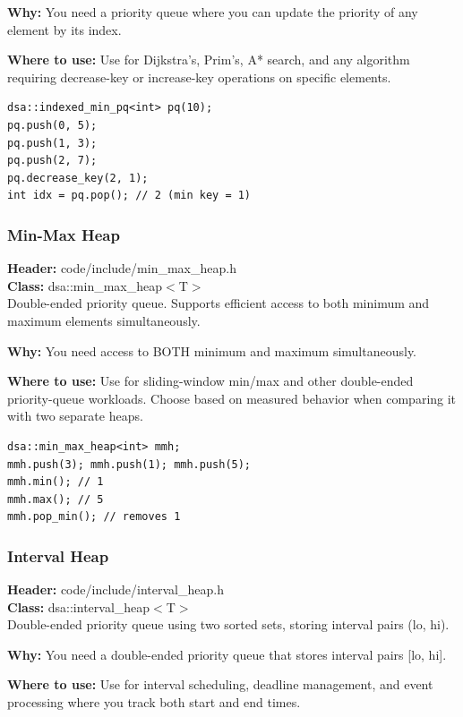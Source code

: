 \documentclass[11pt]{article}
\begin{document}
\textbf{Why:} You need a priority queue where you can update the priority of any element by its index. \par \textbf{Where to use:} Use for Dijkstra's, Prim's, A* search, and any algorithm requiring decrease-key or increase-key operations on specific elements.

\begin{lstlisting}
dsa::indexed_min_pq<int> pq(10);
pq.push(0, 5);
pq.push(1, 3);
pq.push(2, 7);
pq.decrease_key(2, 1);
int idx = pq.pop(); // 2 (min key = 1)
\end{lstlisting}

\subsubsection{Min-Max Heap}
\textbf{Header:} code/include/min\_max\_heap.h\\
\textbf{Class:} dsa::min\_max\_heap$<$T$>$\\

Double-ended priority queue. Supports efficient access to both minimum and maximum elements simultaneously.

\textbf{Why:} You need access to BOTH minimum and maximum simultaneously. \par \textbf{Where to use:} Use for sliding-window min/max and other double-ended priority-queue workloads. Choose based on measured behavior when comparing it with two separate heaps.

\begin{lstlisting}
dsa::min_max_heap<int> mmh;
mmh.push(3); mmh.push(1); mmh.push(5);
mmh.min(); // 1
mmh.max(); // 5
mmh.pop_min(); // removes 1
\end{lstlisting}

\subsubsection{Interval Heap}
\textbf{Header:} code/include/interval\_heap.h\\
\textbf{Class:} dsa::interval\_heap$<$T$>$\\

Double-ended priority queue using two sorted sets, storing interval pairs (lo, hi).

\textbf{Why:} You need a double-ended priority queue that stores interval pairs [lo, hi]. \par \textbf{Where to use:} Use for interval scheduling, deadline management, and event processing where you track both start and end times.
\end{document}
